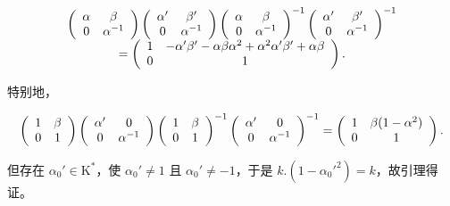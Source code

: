 \[
\begin{array}{c} \left( \begin{array}{c c} \alpha & \beta \\ 0 & \alpha^ {- 1} \end{array} \right) \left( \begin{array}{c c} \alpha^ {\prime} & \beta^ {\prime} \\ 0 & \alpha^ {- 1} \end{array} \right) \left( \begin{array}{c c} \alpha & \beta \\ 0 & \alpha^ {- 1} \end{array} \right) ^ {- 1} \left( \begin{array}{c c} \alpha^ {\prime} & \beta^ {\prime} \\ 0 & \alpha^ {- 1} \end{array} \right) ^ {- 1} \\ = \left( \begin{array}{c c} 1 & - \alpha^ {\prime} \beta^ {\prime} - \alpha \beta \alpha^ {2} + \alpha^ {2} \alpha^ {\prime} \beta^ {\prime} + \alpha \beta \\ 0 & 1 \end{array} \right). \end{array}
\]

特别地，

\[
\left( \begin{array}{c c} 1 & \beta \\ 0 & 1 \end{array} \right) \left( \begin{array}{c c} \alpha^ {\prime} & 0 \\ 0 & \alpha^ {- 1} \end{array} \right) \left( \begin{array}{c c} 1 & \beta \\ 0 & 1 \end{array} \right) ^ {- 1} \left( \begin{array}{c c} \alpha^ {\prime} & 0 \\ 0 & \alpha^ {- 1} \end{array} \right) ^ {- 1} = \left( \begin{array}{c c} 1 & \beta (1 - \alpha^ {2}) \\ 0 & 1 \end{array} \right).
\]

但存在 \(\alpha_0' \in \mathrm{K}^*\)，使 \(\alpha_0' \neq 1\) 且 \(\alpha_0' \neq -1\)，于是 \(k.(1 - \alpha_0'^2) = k\)，故引理得证。

